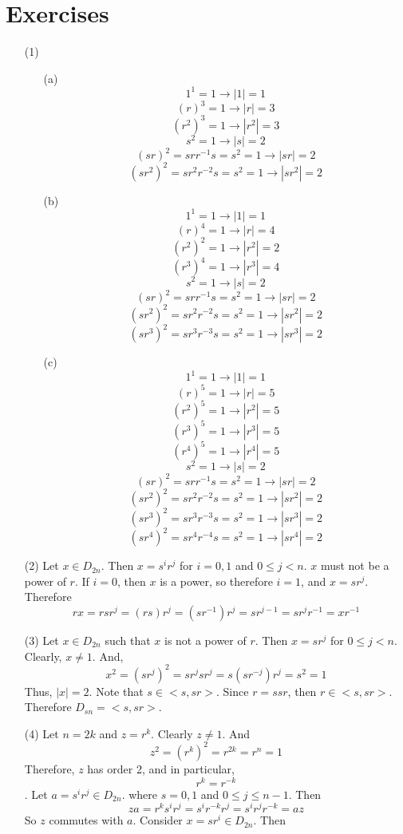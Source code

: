 \documentclass[12pt]{article}
\begin{document}
\section*{Exercises}
\begin{itemize}
\item[(1)]
\begin{itemize}
\item[(a)]
$$1^1 = 1 \rightarrow |1| = 1$$
$$(r)^3 = 1 \rightarrow |r| = 3$$
$$(r^2)^3 = 1 \rightarrow |r^2| = 3$$
$$s^2 = 1 \rightarrow |s| = 2$$
$$(sr)^2 = srr^{-1}s = s^2 = 1 \rightarrow |sr| = 2$$
$$(sr^2)^2 = sr^2r^{-2}s = s^2 = 1 \rightarrow |sr^2| = 2$$
\item[(b)]
$$1^1 = 1 \rightarrow |1| = 1$$
$$(r)^4 = 1 \rightarrow |r| = 4$$
$$(r^2)^2 = 1 \rightarrow |r^2| = 2$$
$$(r^3)^4 = 1 \rightarrow |r^3| = 4$$
$$s^2 = 1 \rightarrow |s| = 2$$
$$(sr)^2 = srr^{-1}s = s^2 = 1 \rightarrow |sr| = 2$$
$$(sr^2)^2 = sr^2r^{-2}s = s^2 = 1 \rightarrow |sr^2| = 2$$
$$(sr^3)^2 = sr^3r^{-3}s = s^2 = 1 \rightarrow |sr^3| = 2$$
\item[(c)]
$$1^1 = 1 \rightarrow |1| = 1$$
$$(r)^5 = 1 \rightarrow |r| = 5$$
$$(r^2)^5 = 1 \rightarrow |r^2| = 5$$
$$(r^3)^5 = 1 \rightarrow |r^3| = 5$$
$$(r^4)^5 = 1 \rightarrow |r^4| = 5$$
$$s^2 = 1 \rightarrow |s| = 2$$
$$(sr)^2 = srr^{-1}s = s^2 = 1 \rightarrow |sr| = 2$$
$$(sr^2)^2 = sr^2r^{-2}s = s^2 = 1 \rightarrow |sr^2| = 2$$
$$(sr^3)^2 = sr^3r^{-3}s = s^2 = 1 \rightarrow |sr^3| = 2$$
$$(sr^4)^2 = sr^4r^{-4}s = s^2 = 1 \rightarrow |sr^4| = 2$$
\end{itemize}
\item[(2)]
Let $x \in D_{2n}$. Then $x = s^ir^j$ for $i = 0, 1$ and $0 \leq j < n$. $x$ must not be a power of $r$. If $i = 0$, then $x$ is a power, so therefore $i = 1$, and $x = sr^j$. Therefore
$$rx = rsr^j = (rs)r^j = (sr^{-1})r^j = sr^{j - 1} = sr^jr^{-1} = xr^{-1}$$
\item[(3)]
Let $x \in D_{2n}$ such that $x$ is not a power of $r$. Then $x = sr^j$ for $0 \leq j < n$. Clearly, $x \neq 1$. And,
$$x^2 = (sr^j)^2 = sr^jsr^j = s(sr^{-j})r^j = s^2 = 1$$
Thus, $|x| = 2$. Note that $s \in <s, sr>$. Since $r = ssr$, then $r \in <s, sr>$. Therefore $D_{sn} = <s, sr>$.
\item[(4)]
Let $n = 2k$ and $z = r^k$. Clearly $z \neq 1$. And
$$z^2 = (r^k)^2 = r^{2k} = r^n = 1$$
Therefore, $z$ has order 2, and in particular,
$$r^k = r^{-k}$$.
Let $a = s^ir^j \in D_{2n}$. where $s = 0, 1$ and $0 \leq j \leq n - 1$. Then
$$za = r^ks^ir^j = s^ir^{-k}r^j = s^ir^jr^{-k} = az$$
So $z$ commutes with $a$. Consider $x = sr^i \in D_{2n}$. Then

\end{itemize}
\end{document}
